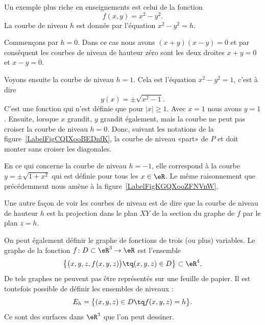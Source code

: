 \begin{example}
    Un exemple plus riche en enseignements est celui de la fonction
    \begin{equation}
        f(x,y)=x^2-y^2.
    \end{equation}
    La courbe de niveau $h$ est donnée par l'équation $x^2-y^2=h$.

    Commençons par $h=0$. Dans ce cas nous avons $(x+y)(x-y)=0$ et par conséquent les courbes de niveau de hauteur zéro sont les deux droites $x+y=0$ et $x-y=0$.

    Voyons ensuite la courbe de niveau $h=1$. Cela est l'équation $x^2-y^2=1$, c'est à dire
    \begin{equation}
        y(x)=\pm\sqrt{x^2-1}.
    \end{equation}
    C'est une fonction qui n'est définie que pour $| x |\geq 1$. Avec $x=1$ nous avons $y=1$. Ensuite, lorsque $x$ grandit, $y$ grandit également, mais la courbe ne peut pas croiser la courbe de niveau $h=0$. Donc, suivant les notations de la figure~\ref{LabelFigCQIXooBEDnfK}, la courbe de niveau «part» de $P$ et doit monter sans croiser les diagonales.


\newcommand{\CaptionFigCQIXooBEDnfK}{La courbe de niveau $h=1$ de $x^2-y^2$. Notez qu'elle est en deux morceaux.}


\newcommand{\CaptionFigKGQXooZFNVnW}{La courbe de niveau $x^2-y^2=-1$.}


    En ce qui concerne la courbe de niveau $h=-1$, elle correspond à la courbe $y=\pm\sqrt{1+x^2}$ qui est définie pour tous les $x\in\eR$. Le même raisonnement que précédemment nous amène à la figure~\ref{LabelFigKGQXooZFNVnW}.

\end{example}

Une autre façon de voir les courbes de niveau est de dire que la courbe de niveau de hauteur $h$ est la projection dans le plan $XY$ de la section du graphe de $f$ par le plan $z=h$.

On peut également définir le graphe de fonctions de trois (ou plus) variables. Le graphe de la fonction $f\colon D\subset\eR^3\to \eR$ est l'ensemble
\begin{equation}
    \big\{ \big( x,y,z,f(x,y,z) \big)\tq (x,y,z)\in D \big\}\subset \eR^4.
\end{equation}
De tels graphes ne peuvent pas être représentés sur une feuille de papier. Il est toutefois possible de définir les ensembles de niveaux :
\begin{equation}
    E_h=\big\{ (x,y,z)\in D\tq  f(x,y,z)=h\big\}.
\end{equation}
Ce sont des surfaces dans $\eR^3$ que l'on peut dessiner.

